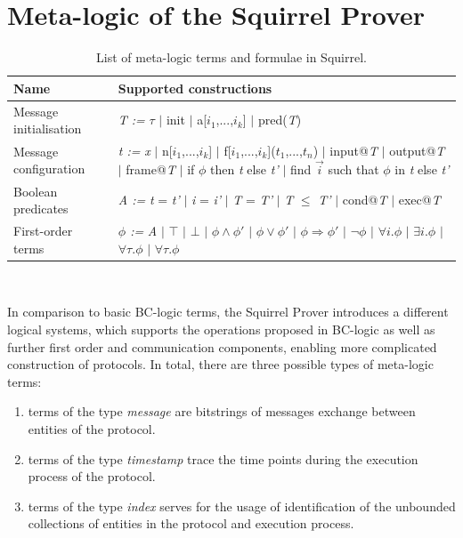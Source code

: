 \documentclass[conference]{IEEEtran}
\begin{document}
\section{Meta-logic of the Squirrel Prover}
\begin{table}[ht]
\centering
\begin{tabular}{ ||p{1.5cm}|p{6cm}|| }
     \hline
      Name & Supported constructions\\
     \hline
     \rowcolor{gray!30}
     Message initialisation & \textit{T :=} $\tau$ $\mid$ init $\mid$ a[$i_1$,...,$i_k$] $\mid$ pred(\textit{T}) \\
     Message configuration & \textit{t :=} \textit{x} $\mid$ n[$i_1$,...,$i_k$] $\mid$ f[$i_1$,...,$i_k$]($t_1$,...,$t_n$) $\mid$ input@\textit{T} $\mid$ output@\textit{T} $\mid$ frame@\textit{T} $\mid$ if $\phi$ then \textit{t} else \textit{t'} $\mid$
     find $\Vec{i}$ such that $\phi$ in \textit{t} else \textit{t'}\\
     \rowcolor{gray!30}
     Boolean predicates & \textit{A := } \textit{t} = \textit{t'} $\mid$ \textit{i} = \textit{i'} $\mid$ \textit{T} = \textit{T'} $\mid$ \textit{T} $\leq$ \textit{T'} $\mid$ cond@\textit{T} $\mid$ exec@\textit{T}\\
     First-order terms & \textit{$\phi$ := } \textit{A} $\mid$ $\top$ $\mid$ $\bot$ $\mid$ $\phi \land \phi'$ $\mid$ $\phi \lor \phi'$ 
     $\mid$ $\phi \Rightarrow \phi'$ $\mid$ $\neg \phi$ $\mid$ $\forall i. \phi$ $\mid$ $\exists i. \phi$ $\mid$ $\forall \tau. \phi$ $\mid$ $\forall \tau. \phi$ \\
     \hline
\end{tabular}
\\[10pt]
\caption{List of meta-logic terms and formulae in Squirrel.}
\label{table:3}
\end{table}
In comparison to basic BC-logic terms, the Squirrel Prover introduces a different logical systems, which supports the operations proposed in BC-logic as well as further first order and communication components, enabling more complicated construction of protocols.  In total, there are three possible types of meta-logic terms:
\begin{enumerate}
    \item terms of the type \textit{message} are bitstrings of messages exchange between entities of the protocol.
    \item terms of the type \textit{timestamp} trace the time points during the execution process of the protocol. 
    \item terms of the type \textit{index} serves for the usage of identification of the unbounded collections of entities in the protocol and execution process.
\end{enumerate}
\end{document}
